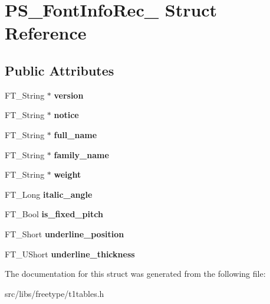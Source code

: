 \hypertarget{struct_p_s___font_info_rec__}{
\section{PS\_\-FontInfoRec\_\- Struct Reference}
\label{struct_p_s___font_info_rec__}
}
\subsection*{Public Attributes}
\begin{DoxyCompactItemize}
\item 
\hypertarget{struct_p_s___font_info_rec___adb595076e50f8e7ece9446f612433cfc}{
FT\_\-String $\ast$ {\bfseries version}}
\label{struct_p_s___font_info_rec___adb595076e50f8e7ece9446f612433cfc}

\item 
\hypertarget{struct_p_s___font_info_rec___a63858ebce653f21d9aa2ddc61ee32b80}{
FT\_\-String $\ast$ {\bfseries notice}}
\label{struct_p_s___font_info_rec___a63858ebce653f21d9aa2ddc61ee32b80}

\item 
\hypertarget{struct_p_s___font_info_rec___a039dbf76ccc1b63b03e77215cb4b430b}{
FT\_\-String $\ast$ {\bfseries full\_\-name}}
\label{struct_p_s___font_info_rec___a039dbf76ccc1b63b03e77215cb4b430b}

\item 
\hypertarget{struct_p_s___font_info_rec___ac54d883f153a495f9a20dc043ed434cf}{
FT\_\-String $\ast$ {\bfseries family\_\-name}}
\label{struct_p_s___font_info_rec___ac54d883f153a495f9a20dc043ed434cf}

\item 
\hypertarget{struct_p_s___font_info_rec___a057243ec7cf62f573fa675ccb728f4b1}{
FT\_\-String $\ast$ {\bfseries weight}}
\label{struct_p_s___font_info_rec___a057243ec7cf62f573fa675ccb728f4b1}

\item 
\hypertarget{struct_p_s___font_info_rec___ab558a75a56fadd54dfc71dcbeec1375a}{
FT\_\-Long {\bfseries italic\_\-angle}}
\label{struct_p_s___font_info_rec___ab558a75a56fadd54dfc71dcbeec1375a}

\item 
\hypertarget{struct_p_s___font_info_rec___a68e2d0913fe910ea86d558a4a426412a}{
FT\_\-Bool {\bfseries is\_\-fixed\_\-pitch}}
\label{struct_p_s___font_info_rec___a68e2d0913fe910ea86d558a4a426412a}

\item 
\hypertarget{struct_p_s___font_info_rec___a772af52d17288d7846e8893e74d55212}{
FT\_\-Short {\bfseries underline\_\-position}}
\label{struct_p_s___font_info_rec___a772af52d17288d7846e8893e74d55212}

\item 
\hypertarget{struct_p_s___font_info_rec___a423904e811db5195485557bf0dccf126}{
FT\_\-UShort {\bfseries underline\_\-thickness}}
\label{struct_p_s___font_info_rec___a423904e811db5195485557bf0dccf126}

\end{DoxyCompactItemize}


The documentation for this struct was generated from the following file:\begin{DoxyCompactItemize}
\item 
src/libs/freetype/t1tables.h\end{DoxyCompactItemize}
